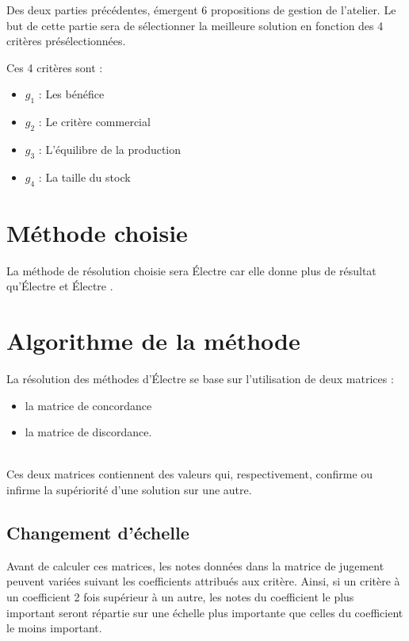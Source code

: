 
Des deux parties précédentes, émergent 6 propositions de gestion de l'atelier.
Le but de cette partie sera de sélectionner la meilleure solution en fonction des 4 critères présélectionnées.

Ces 4 critères sont :
\begin{itemize}
	\item $g_1$ : Les bénéfice
	\item $g_2$ : Le critère commercial
	\item $g_3$ : L'équilibre de la production
	\item $g_4$ : La taille du stock
\end{itemize}

\section{Méthode choisie}

La méthode de résolution choisie sera Électre  car elle donne plus de résultat qu'Électre  et Électre .

\section{Algorithme de la méthode}

La résolution des méthodes d'Électre se base sur l'utilisation de deux matrices : 
\begin{itemize}
	\item la matrice de concordance
	\item la matrice de discordance.
\end{itemize}
~\\
Ces deux matrices contiennent des valeurs qui, respectivement, confirme ou infirme la supériorité d'une solution sur une autre.\\

\subsection{Changement d'échelle}
Avant de calculer ces matrices, les notes données dans la matrice de jugement peuvent variées suivant les coefficients attribués aux critère. Ainsi, si un critère à un coefficient 2 fois supérieur à un autre, les notes du coefficient le plus important seront répartie sur une échelle plus importante que celles du coefficient le moins important.

